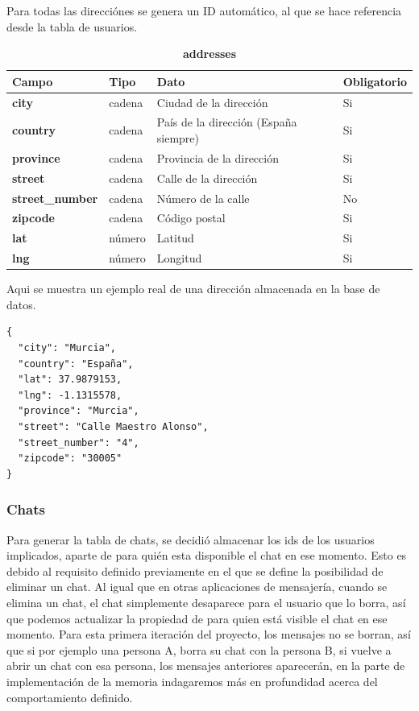 \documentclass[a4paper, 12pt]{article}
\begin{document}
Para todas las direcciónes se genera un ID automático, al que se hace referencia desde la tabla de usuarios.

\begin{table}[H]
\captionsetup{justification=raggedright,singlelinecheck=false}
\caption{\textbf{addresses}}
\label{tab:Addresses}
	\begin{tabular}{|m{3cm}|m{2cm}|m{5cm}|m{3cm}|}
	\hline
	\textbf{Campo} & \textbf{Tipo} & \textbf{Dato} & \textbf{Obligatorio} \\ 
	\hline
	\textbf{city} & cadena & Ciudad de la dirección & Si \\ 
	\hline
	\textbf{country} & cadena & País de la dirección (España siempre) & Si\\ 
	\hline
	\textbf{province} &  cadena & Provincia de la dirección & Si \\ 
	\hline
	\textbf{street} &  cadena & Calle de la dirección & Si \\ 
	\hline
	\textbf{street\_number} &  cadena & Número de la calle & No\\ 
	\hline
	\textbf{zipcode} & cadena & Código postal & Si \\ 
	\hline
	\textbf{lat} & número & Latitud & Si \\ 
	\hline
	\textbf{lng} & número & Longitud & Si \\ 
	\hline
\end{tabular}
\end{table}

Aqui se muestra un ejemplo real de una dirección almacenada en la base de datos.

\begin{verbatim}
{
  "city": "Murcia",
  "country": "España",
  "lat": 37.9879153,
  "lng": -1.1315578,
  "province": "Murcia",
  "street": "Calle Maestro Alonso",
  "street_number": "4",
  "zipcode": "30005"
}
\end{verbatim}

\subsubsection{Chats}

Para generar la tabla de chats, se decidió almacenar los ids de los usuarios implicados, aparte de para quién esta disponible el chat en ese momento. Esto es debido al requisito definido previamente en el que se define la posibilidad de eliminar un chat. Al igual que en otras aplicaciones de mensajería, cuando se elimina un chat, el chat simplemente desaparece para el usuario que lo borra, así que podemos actualizar la propiedad de para quien está visible el chat en ese momento. Para esta primera iteración del proyecto, los mensajes no se borran, así que si por ejemplo una persona A, borra su chat con la persona B, si vuelve a abrir un chat con esa persona, los mensajes anteriores aparecerán, en la parte de implementación de la memoria indagaremos más en profundidad acerca del comportamiento definido. 
\end{document}
